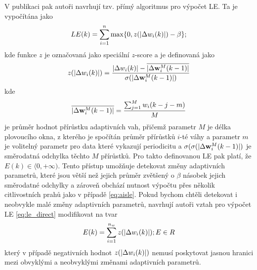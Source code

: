 \par
V publikaci \cite{ivoLE2} pak autoři navrhují tzv. přímý algoritmus pro výpočet LE. Ta je vypočítána jako
\begin{equation}\label{eq:le_direct}
LE(k)=\sum_{i=1}^n \max \{0,z(\lvert\Delta w_i(k)\rvert)-\beta \};
\end{equation}
kde funkce $z$ je označovaná jako speciální $z$-score a je definovaná jako
\begin{equation}
z(\lvert\Delta w_i(k)\rvert) = \frac{\lvert\Delta w_i(k)\rvert-\overline{\lvert\Delta\textbf{w}_i^M(k-1)\rvert}}{\sigma(\lvert\Delta \textbf{w}_i^M(k-1)\rvert)}
\end{equation}
kde
\begin{equation}
\overline{\lvert\Delta \textbf{w}_i^M(k-1)\rvert}=\frac{\sum_{j=1}^M w_i(k-j-m)}{M}
\end{equation} 
je průměr hodnot přírůstku adaptivních vah, přičemž parametr $M$ je délka plovoucího okna, z kterého je spočítán průměr přírůstků $i$-té váhy a parametr $m$ je volitelný parametr pro data které vykazují periodicitu a $\sigma(\sigma(\lvert\Delta \textbf{w}_i^M(k-1)\rvert)$ je směrodatná odchylka těchto $M$ přírůstků. Pro takto definovanou LE pak platí, že $E(k)\in \langle0,+\infty)$. Tento přístup umožňuje detekovat změny adaptivních parametrů, které jsou větší než jejich průměr zvětšený o $\beta$ násobek jejich směrodatné odchylky a zároveň obchází nutnost výpočtu přes několik citlivostních prahů jako v případě \ref{eq:aisle}. Pokud bychom chtěli detekovat i neobvykle malé změny adaptivních parametrů, navrhují autoři vztah pro výpočet LE \ref{eq:le_direct} modifikovat na tvar
\begin{equation}\label{eq:le_direct_padasip}
E(k)=\sum_{i=1}^{n_w}z(\lvert\Delta w_i(k)\rvert); E \in R
\end{equation}
který v případě negativních hodnot $z(\lvert\Delta w_i(k)\rvert)$ nemusí poskytovat jasnou hranici mezi obvyklými a neobvyklými změnami adaptivních parametrů.
